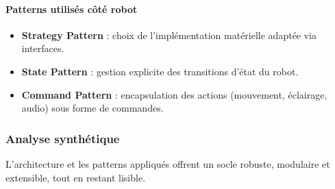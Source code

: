 \paragraph{Patterns utilisés côté robot}
\begin{itemize}
    \item \textbf{Strategy Pattern} : choix de l’implémentation matérielle adaptée via interfaces.
    \item \textbf{State Pattern} : gestion explicite des transitions d’état du robot.
    \item \textbf{Command Pattern} : encapsulation des actions (mouvement, éclairage, audio) sous forme de commandes.
\end{itemize}

\subsubsection{Analyse synthétique}
L’architecture et les patterns appliqués offrent un socle robuste, modulaire et extensible, tout en restant lisible.
